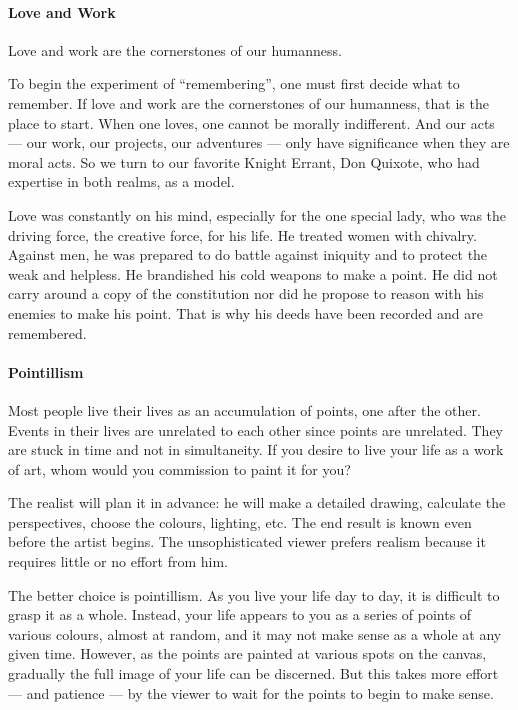 \paragraph{Love and Work}


\begin{quotex}
Love and work are the cornerstones of our humanness.
\end{quotex}


To begin the experiment of ``remembering'', one must first decide what to remember. If love and work are the cornerstones of our humanness, that is the place to start. When one loves, one cannot be morally indifferent. And our acts --- our work, our projects, our adventures --- only have significance when they are moral acts. So we turn to our favorite Knight Errant, Don Quixote, who had expertise in both realms, as a model.

Love was constantly on his mind, especially for the one special lady, who was the driving force, the creative force, for his life. He treated women with chivalry. Against men, he was prepared to do battle against iniquity and to protect the weak and helpless. He brandished his cold weapons to make a point. He did not carry around a copy of the constitution nor did he propose to reason with his enemies to make his point. That is why his deeds have been recorded and are remembered.

\paragraph{Pointillism}


Most people live their lives as an accumulation of points, one after the other. Events in their lives are unrelated to each other since points are unrelated. They are stuck in time and not in simultaneity. If you desire to live your life as a work of art, whom would you commission to paint it for you?

The realist will plan it in advance: he will make a detailed drawing, calculate the perspectives, choose the colours, lighting, etc. The end result is known even before the artist begins. The unsophisticated viewer prefers realism because it requires little or no effort from him.

The better choice is pointillism. As you live your life day to day, it is difficult to grasp it as a whole. Instead, your life appears to you as a series of points of various colours, almost at random, and it may not make sense as a whole at any given time. However, as the points are painted at various spots on the canvas, gradually the full image of your life can be discerned. But this takes more effort --- and patience --- by the viewer to wait for the points to begin to make sense.

